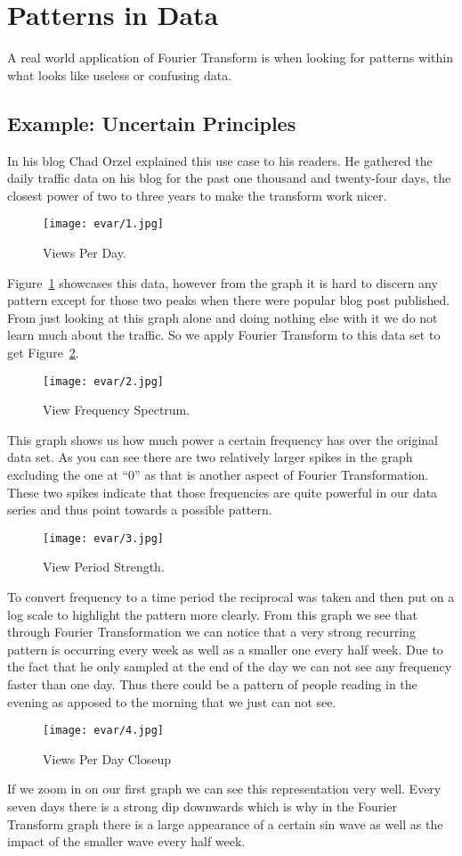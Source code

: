 \documentclass [../article.tex]{subfiles}
\begin{document}
  \section{Patterns in Data}
  A real world application of Fourier Transform is when
  looking for patterns within what looks like useless or
  confusing data.
  \subsection{Example: Uncertain Principles}
  In his blog Chad Orzel explained this use
  case to his readers. He gathered the daily traffic data on his
  blog for the past one thousand and twenty-four days, the closest
  power of two to three years to make the transform work nicer.
  \begin{figure}[htbp]
    \centering
    \texttt{[image: evar/1.jpg]}
    \caption{Views Per Day.}
    \label{fig:views}
  \end{figure}
  Figure~\ref{fig:views} showcases this data, however from the
  graph it is hard to discern any pattern except for those two peaks
  when there were popular blog post published.
  From just looking at this graph
  alone and doing nothing else with it we do not learn much
  about the traffic. So we apply Fourier Transform to this
  data set to get Figure~\ref{fig:viewfreq}.
  \begin{figure}[htbp]
    \centering
    \texttt{[image: evar/2.jpg]}
    \caption{View Frequency Spectrum.}
    \label{fig:viewfreq}
  \end{figure}
  This graph shows us how much power a certain frequency has over
  the original data set. As you can see there are two relatively
  larger spikes in the graph excluding the one at ``0'' as that is
  another aspect of Fourier Transformation. These two spikes indicate
  that those frequencies are quite powerful in our data series and thus
  point towards a possible pattern.
  \begin{figure}[htbp]
    \centering
    \texttt{[image: evar/3.jpg]}
    \caption{View Period Strength.}
    \label{fig:viewperiods}
  \end{figure}
  To convert frequency to a time period the reciprocal was taken and then
  put on a log scale to highlight the pattern more clearly. From this graph
  we see that through Fourier Transformation we can notice that a very
  strong recurring pattern is occurring every week as well as a
  smaller one every half week. Due to the fact that he only sampled
  at the end of the day we can not see any frequency faster than one
  day. Thus there could be a pattern of people reading in the evening as
  apposed to the morning that we just can not see.
  \begin{figure}[htbp]
    \centering
    \texttt{[image: evar/4.jpg]}
    \caption{Views Per Day Closeup}
    \label{fig:viewcloseup}
  \end{figure}
  If we zoom in on our first graph we can see this representation very
  well. Every seven days there is a strong dip downwards  which is
  why in the Fourier Transform graph there is a large appearance of
  a certain sin wave as well as the impact of the smaller wave every
  half week.
\end{document}
